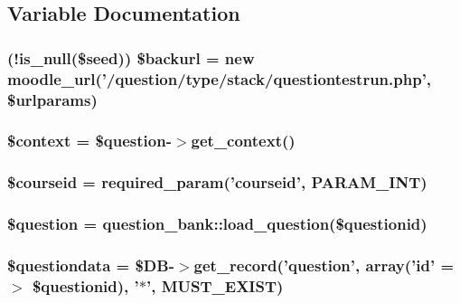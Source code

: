 \subsection{Variable Documentation}
\hypertarget{questiontestdelete_8php_a28d8c96a7ddca2daae7a03f1567d1c3a}{
\subsubsection[{\$backurl}]{ (!is\_\-null(\$seed)) \$backurl = new moodle\_\-url('/question/type/stack/questiontestrun.php', \$urlparams)}}
\label{questiontestdelete_8php_a28d8c96a7ddca2daae7a03f1567d1c3a}
\hypertarget{questiontestdelete_8php_ae05dedb802ada0155efdece2044fed64}{
\subsubsection[{\$context}]{\setlength{\rightskip}{0pt plus 5cm}\$context = \$question-\/$>$get\_\-context()}}
\label{questiontestdelete_8php_ae05dedb802ada0155efdece2044fed64}
\hypertarget{questiontestdelete_8php_a2a1b481ca3e5ae5c2d7a66d271302f23}{
\subsubsection[{\$courseid}]{\setlength{\rightskip}{0pt plus 5cm}\$courseid = required\_\-param('courseid', PARAM\_\-INT)}}
\label{questiontestdelete_8php_a2a1b481ca3e5ae5c2d7a66d271302f23}
\hypertarget{questiontestdelete_8php_acf0d1ba8b3999333306bf1a4fd363e93}{
\subsubsection[{\$question}]{\setlength{\rightskip}{0pt plus 5cm}\$question = question\_\-bank::load\_\-question(\$questionid)}}
\label{questiontestdelete_8php_acf0d1ba8b3999333306bf1a4fd363e93}
\hypertarget{questiontestdelete_8php_ab3dbd2b3f38fc871b3aba59ed0657c55}{
\subsubsection[{\$questiondata}]{\setlength{\rightskip}{0pt plus 5cm}\$questiondata = \$DB-\/$>$get\_\-record('question', array('id' =$>$ \$questionid), '$\ast$', MUST\_\-EXIST)}}
